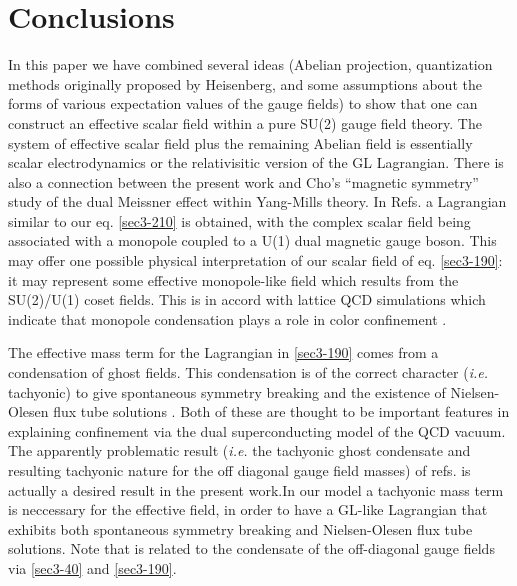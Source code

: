 \documentclass[a4paper,aps,showpacs]{revtex4}
\begin{document}
\section{Conclusions}

In this paper we have combined several ideas (Abelian projection, quantization 
methods originally proposed by Heisenberg, and some assumptions about the
forms of various expectation values of the gauge fields) to show that
one can construct an effective scalar field within a pure SU(2) gauge field 
theory. The system of effective scalar field plus the remaining Abelian 
field is essentially scalar electrodynamics or the relativisitic version
of the GL Lagrangian. There is also a
connection between the present work and Cho's \cite{cho} ``magnetic
symmetry'' study of the dual Meissner effect within Yang-Mills theory.
In Refs. \cite{cho} a Lagrangian similar to our eq. \eqref{sec3-210}
is obtained, with the complex scalar field being associated with a monopole
coupled to a U(1) dual magnetic gauge boson. This may offer one possible
physical interpretation of our scalar field of eq. \eqref{sec3-190}:
it may represent some effective monopole-like field which results from
the SU(2)/U(1) coset fields. This is in accord with lattice QCD simulations
which indicate that monopole condensation plays a role in
color confinement \cite{kron}.  

The effective mass term for the Lagrangian in \eqref{sec3-190} comes from
a condensation of ghost fields. This condensation is of the correct character
({\it i.e.} tachyonic) to give spontaneous
symmetry breaking and the existence of Nielsen-Olesen flux tube solutions 
\cite{no}. Both of these are thought to be important features in 
explaining confinement via the dual superconducting model of the QCD vacuum.
The apparently problematic result ({\it i.e.} the tachyonic ghost condensate and
resulting tachyonic nature for the off diagonal gauge field masses)
of refs. \cite{dudal} \cite{lemes} is actually a desired result in the
present work.In our model a tachyonic mass
term is neccessary for the effective field, \myHighlight{$\varphi$}\coordHE{} in order to have
a GL-like Lagrangian that exhibits both spontaneous symmetry breaking and
Nielsen-Olesen flux tube solutions. Note that 
\myHighlight{$\varphi$}\coordHE{} is related to the condensate of the off-diagonal gauge fields
via \eqref{sec3-40} and \eqref{sec3-190}. 
\end{document}
